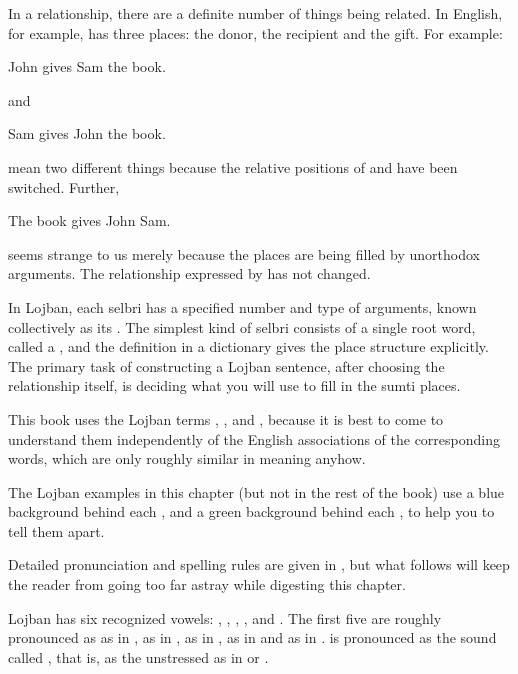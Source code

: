 In a relationship, there are a definite number of things being related. In English, for example,  has three places: the donor, the recipient and the gift. For example:
\begin{example}
John gives Sam the book.
\end{example}

{\noindent}and
\begin{example}
Sam gives John the book.
\end{example}

{\noindent}mean two different things because the relative positions of  and  have been switched. Further,
\begin{example}
The book gives John Sam.
\end{example}

{\noindent}seems strange to us merely because the places are being filled by unorthodox arguments. The relationship expressed by  has not changed. 

In Lojban, each selbri has a specified number and type of arguments, known collectively as its . The simplest kind of selbri consists of a single root word, called a , and the definition in a dictionary gives the place structure explicitly. The primary task of constructing a Lojban sentence, after choosing the relationship itself, is deciding what you will use to fill in the sumti places.

This book uses the Lojban terms , , and , because it is best to come to understand them independently of the English associations of the corresponding words, which are only roughly similar in meaning anyhow.

The Lojban examples in this chapter (but not in the rest of the book) use a blue background behind each , and a green background behind each , to help you to tell them apart.



Detailed pronunciation and spelling rules are given in , but what follows will keep the reader from going too far astray while digesting this chapter.

Lojban has six recognized vowels: , , , ,  and . The first five are roughly pronounced as  as in ,  as in ,  as in ,  as in  and  as in .  is pronounced as the sound called , that is, as the unstressed  as in  or .

